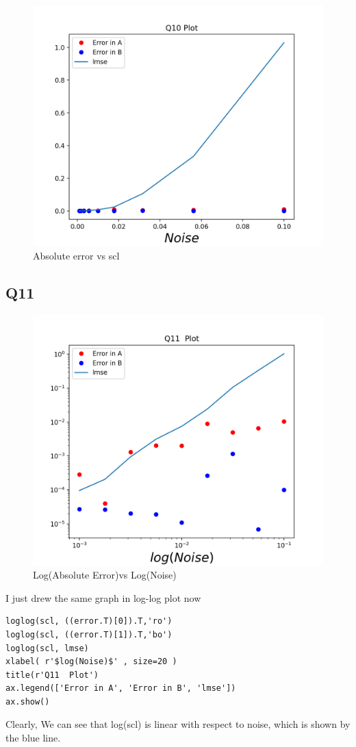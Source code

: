 \documentclass[12pt, a4paper]{report}
\begin{document}
\begin{figure}[!tbh]
   	\centering
   	\includegraphics[scale=0.5]{Qn10.png}
   	\caption{Absolute error vs scl}
   	\label{fig:EVN}
   \end{figure}


 \subsection{Q11}
 \begin{figure}[!tbh]
   	\centering
   	\includegraphics[scale=0.5]{Qn11.png}
   	\caption{Log(Absolute Error)vs Log(Noise)}
   	\label{fig:loglog}
   \end{figure}
I just drew the same graph in log-log plot now
 \begin{Verbatim}
loglog(scl, ((error.T)[0]).T,'ro')
loglog(scl, ((error.T)[1]).T,'bo')
loglog(scl, lmse)
xlabel( r'$log(Noise)$' , size=20 )
title(r'Q11  Plot')
ax.legend(['Error in A', 'Error in B', 'lmse'])
ax.show()
\end{Verbatim}
Clearly, We can see that log(scl) is linear with respect to noise, which is shown by the blue line.
\end{document}
